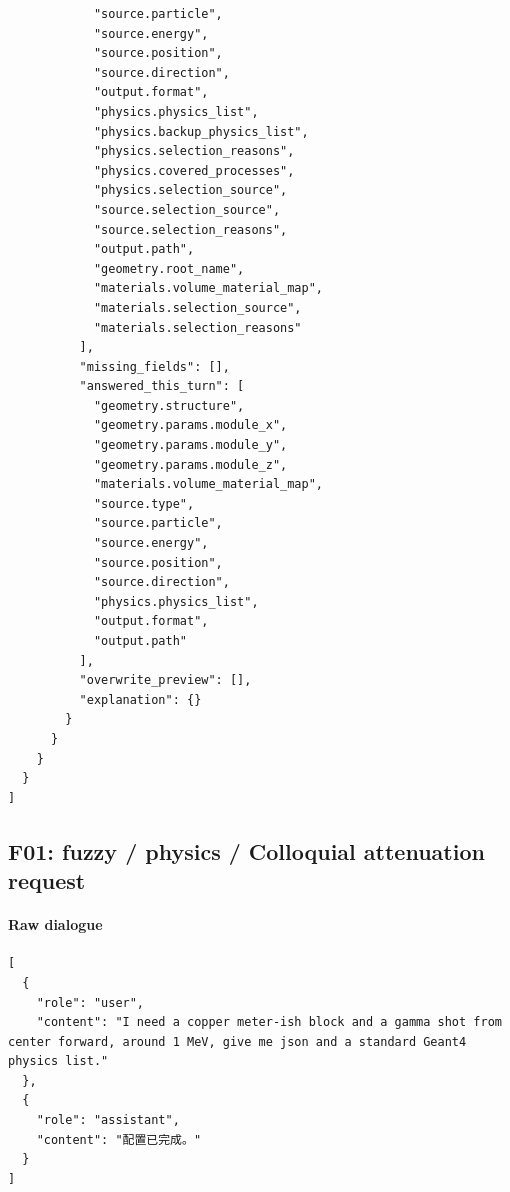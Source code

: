 \documentclass[11pt]{article}
\begin{document}
\begin{lstlisting}
            "source.particle",
            "source.energy",
            "source.position",
            "source.direction",
            "output.format",
            "physics.physics_list",
            "physics.backup_physics_list",
            "physics.selection_reasons",
            "physics.covered_processes",
            "physics.selection_source",
            "source.selection_source",
            "source.selection_reasons",
            "output.path",
            "geometry.root_name",
            "materials.volume_material_map",
            "materials.selection_source",
            "materials.selection_reasons"
          ],
          "missing_fields": [],
          "answered_this_turn": [
            "geometry.structure",
            "geometry.params.module_x",
            "geometry.params.module_y",
            "geometry.params.module_z",
            "materials.volume_material_map",
            "source.type",
            "source.particle",
            "source.energy",
            "source.position",
            "source.direction",
            "physics.physics_list",
            "output.format",
            "output.path"
          ],
          "overwrite_preview": [],
          "explanation": {}
        }
      }
    }
  }
]
\end{lstlisting}
\subsection{F01: fuzzy / physics / Colloquial attenuation request}
\paragraph{Raw dialogue}
\begin{lstlisting}
[
  {
    "role": "user",
    "content": "I need a copper meter-ish block and a gamma shot from center forward, around 1 MeV, give me json and a standard Geant4 physics list."
  },
  {
    "role": "assistant",
    "content": "配置已完成。"
  }
]
\end{lstlisting}
\end{document}

